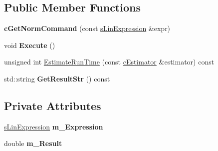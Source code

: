 \subsection*{Public Member Functions}
\begin{DoxyCompactItemize}
\item 
\hypertarget{classengine_1_1cGetNormCommand_a353d6cf6d2dec48ddca87c2c4217d798}{{\bfseries c\-Get\-Norm\-Command} (const \hyperlink{structengine_1_1sLinExpression}{s\-Lin\-Expression} \&expr)}\label{classengine_1_1cGetNormCommand_a353d6cf6d2dec48ddca87c2c4217d798}

\item 
\hypertarget{classengine_1_1cGetNormCommand_a7542f372a05f7d1a3caee3c6249082ef}{void {\bfseries Execute} ()}\label{classengine_1_1cGetNormCommand_a7542f372a05f7d1a3caee3c6249082ef}

\item 
unsigned int \hyperlink{classengine_1_1cGetNormCommand_afee08e7e84b009b5f3d41b9888f80f2c}{Estimate\-Run\-Time} (const \hyperlink{classengine_1_1cEstimator}{c\-Estimator} \&estimator) const 
\item 
\hypertarget{classengine_1_1cGetNormCommand_a4b7f458c13d95d6b50377ae99aba8020}{std\-::string {\bfseries Get\-Result\-Str} () const }\label{classengine_1_1cGetNormCommand_a4b7f458c13d95d6b50377ae99aba8020}

\end{DoxyCompactItemize}
\subsection*{Private Attributes}
\begin{DoxyCompactItemize}
\item 
\hypertarget{classengine_1_1cGetNormCommand_ad1cad4a8ee61235d4846f1c1edb2318c}{\hyperlink{structengine_1_1sLinExpression}{s\-Lin\-Expression} {\bfseries m\-\_\-\-Expression}}\label{classengine_1_1cGetNormCommand_ad1cad4a8ee61235d4846f1c1edb2318c}

\item 
\hypertarget{classengine_1_1cGetNormCommand_a0ff6140614a4dca24552fe45104ac17f}{double {\bfseries m\-\_\-\-Result}}\label{classengine_1_1cGetNormCommand_a0ff6140614a4dca24552fe45104ac17f}

\end{DoxyCompactItemize}


